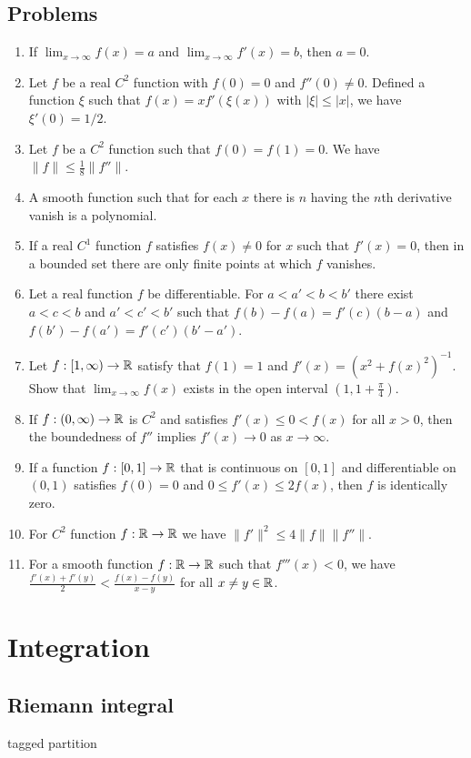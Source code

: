 \documentclass{../../large}
\begin{document}
\section*{Problems}
\begin{enumerate}
\item If $\lim_{x\to\infty}f(x)=a$ and $\lim_{x\to\infty}f'(x)=b$, then $a=0$.
\item Let $f$ be a real $C^2$ function with $f(0)=0$ and $f''(0)\ne0$.
Defined a function $\xi$ such that $f(x)=xf'(\xi(x))$ with $|\xi|\le|x|$, we have $\xi'(0)=1/2$.
\item Let $f$ be a $C^2$ function such that $f(0)=f(1)=0$.
We have $\|f\|\le\frac18\|f''\|$.
\item A smooth function such that for each $x$ there is $n$ having the $n$th derivative vanish is a polynomial.
\item If a real $C^1$ function $f$ satisfies $f(x)\ne0$ for $x$ such that $f'(x)=0$, then in a bounded set there are only finite points at which $f$ vanishes.
\item Let a real function $f$ be differentiable.
For $a<a'<b<b'$ there exist $a<c<b$ and $a'<c'<b'$ such that $f(b)-f(a)=f'(c)(b-a)$ and $f(b')-f(a')=f'(c')(b'-a')$.
\item Let $f:[1,\infty)\to\mathbb{R}$ satisfy that $f(1)=1$ and $f'(x)=(x^2+f(x)^2)^{-1}$. Show that $\lim_{x\to\infty}f(x)$ exists in the open interval $(1,1+\frac\pi4)$.
\item If $f:(0,\infty)\to\mathbb{R}$ is $C^2$ and satisfies $f'(x)\le0<f(x)$ for all $x>0$, then the boundedness of $f''$ implies $f'(x)\to0$ as $x\to\infty$.
\item If a function $f:[0,1]\to\mathbb{R}$ that is continuous on $[0,1]$ and differentiable on $(0,1)$ satisfies $f(0)=0$ and $0\le f'(x)\le2f(x)$, then $f$ is identically zero.
\item For $C^2$ function $f:\mathbb{R}\to\mathbb{R}$ we have $\|f'\|^2\le4\|f\|\|f''\|$.
\item For a smooth function $f:\mathbb{R}\to\mathbb{R}$ such that $f'''(x)<0$, we have $\frac{f'(x)+f'(y)}2<\frac{f(x)-f(y)}{x-y}$ for all $x\ne y\in\mathbb{R}$.
\end{enumerate}






\chapter{Integration}

\section{Riemann integral}
tagged partition
\end{document}
